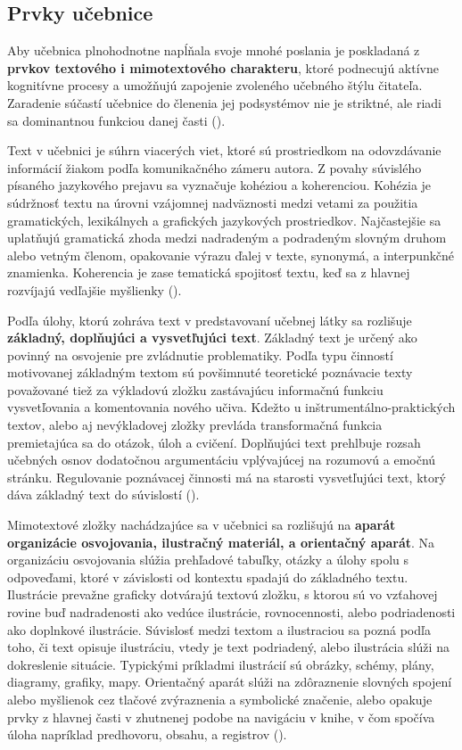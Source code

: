 \subsection{Prvky učebnice}
Aby učebnica plnohodnotne napĺňala svoje mnohé poslania je poskladaná z \textbf{prvkov textového i mimotextového charakteru}, ktoré podnecujú aktívne kognitívne procesy a umožňujú zapojenie zvoleného učebného štýlu čitateľa. Zaradenie súčastí učebnice do členenia jej podsystémov nie je striktné, ale riadi sa dominantnou funkciou danej časti (\cite{zujev_ako_1986}).

Text v učebnici je súhrn viacerých viet, ktoré sú prostriedkom na odovzdávanie informácií žiakom podľa komunikačného zámeru autora. Z povahy súvislého písaného jazykového prejavu sa vyznačuje kohéziou a koherenciou. Kohézia je súdržnosť textu na úrovni vzájomnej nadväznosti medzi vetami za použitia gramatických, lexikálnych a grafických jazykových prostriedkov. Najčastejšie sa uplatňujú gramatická zhoda medzi nadradeným a podradeným slovným druhom alebo vetným členom, opakovanie výrazu ďalej v texte, synonymá, a interpunkčné znamienka. Koherencia je zase tematická spojitosť textu, keď sa z hlavnej rozvíjajú vedľajšie myšlienky   (\cite{gavora_ziak_1992}).

Podľa úlohy, ktorú zohráva text v predstavovaní učebnej látky sa rozlišuje \textbf{základný, doplňujúci a vysvetľujúci text}. Základný text je určený ako povinný na osvojenie pre zvládnutie problematiky. Podľa typu činností motivovanej základným textom sú povšimnuté teoretické poznávacie texty považované tiež za výkladovú zložku zastávajúcu informačnú funkciu vysvetľovania a komentovania nového učiva. Kdežto u inštrumentálno-praktických textov, alebo aj nevýkladovej zložky prevláda transformačná funkcia premietajúca sa do otázok, úloh a cvičení. Doplňujúci text prehlbuje rozsah učebných osnov dodatočnou argumentáciu vplývajúcej na rozumovú a emočnú stránku. Regulovanie poznávacej činnosti má na starosti vysvetľujúci text, ktorý dáva základný text do súvislostí (\cite{zujev_ako_1986}).

Mimotextové zložky nachádzajúce sa v učebnici sa rozlišujú na \textbf{aparát organizácie osvojovania, ilustračný materiál, a orientačný aparát}. Na organizáciu osvojovania slúžia prehľadové tabuľky, otázky a úlohy spolu s odpoveďami, ktoré v závislosti od kontextu spadajú do základného textu. Ilustrácie prevažne graficky dotvárajú textovú zložku, s ktorou sú vo vzťahovej rovine buď nadradenosti ako vedúce ilustrácie, rovnocennosti, alebo podriadenosti ako doplnkové ilustrácie. Súvislosť medzi textom a ilustraciou sa pozná podľa toho, či text opisuje ilustráciu, vtedy je text podriadený, alebo ilustrácia slúži na dokreslenie situácie. Typickými príkladmi ilustrácií sú obrázky, schémy, plány, diagramy, grafiky, mapy. Orientačný aparát slúži na zdôraznenie slovných spojení alebo myšlienok cez tlačové zvýraznenia a symbolické značenie, alebo opakuje prvky z hlavnej časti v zhutnenej podobe na navigáciu v knihe, v čom spočíva úloha napríklad predhovoru, obsahu, a registrov (\cite{zujev_ako_1986}).

